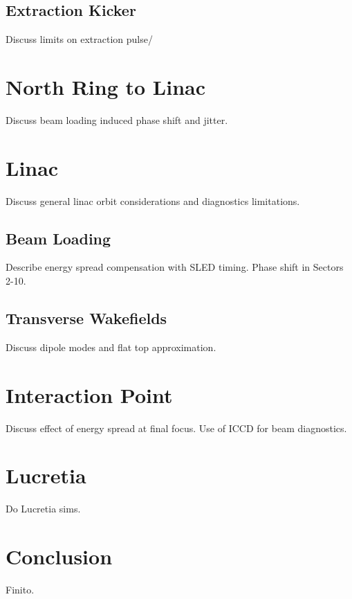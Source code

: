 \documentclass[aps,prl,preprint,groupedaddress]{revtex4-1}
\begin{document}
\subsection{Extraction Kicker}
Discuss limits on extraction pulse/

\section{North Ring to Linac}
Discuss beam loading induced phase shift and jitter.

\section{Linac}
Discuss general linac orbit considerations and diagnostics limitations.

\subsection{Beam Loading}
Describe energy spread compensation with SLED timing. Phase shift in Sectors 2-10.

\subsection{Transverse Wakefields}
Discuss dipole modes and flat top approximation.

\section{Interaction Point}
Discuss effect of energy spread at final focus. Use of ICCD for beam diagnostics.

\section{Lucretia}
Do Lucretia sims.

\section{Conclusion}
Finito.


%
\end{document}
